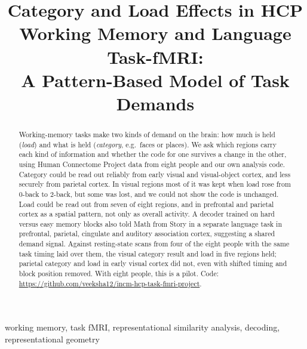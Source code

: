\documentclass[conference]{IEEEtran}
\begin{document}
\title{Category and Load Effects in HCP Working Memory and Language Task-fMRI: \\ A Pattern-Based Model of Task Demands}

\author{
\and
{}
}

\maketitle

\begin{abstract}
Working-memory tasks make two kinds of demand on the brain: how much is held (\emph{load}) and what is held (\emph{category}, e.g.\ faces or places). We ask which regions carry each kind of information and whether the code for one survives a change in the other, using Human Connectome Project data from eight people and our own analysis code. Category could be read out reliably from early visual and visual-object cortex, and less securely from parietal cortex. In visual regions most of it was kept when load rose from 0-back to 2-back, but some was lost, and we could not show the code is unchanged. Load could be read out from seven of eight regions, and in prefrontal and parietal cortex as a spatial pattern, not only as overall activity. A decoder trained on hard versus easy memory blocks also told Math from Story in a separate language task in prefrontal, parietal, cingulate and auditory association cortex, suggesting a shared demand signal. Against resting-state scans from four of the eight people with the same task timing laid over them, the visual category result and load in five regions held; parietal category and load in early visual cortex did not, even with shifted timing and block position removed. With eight people, this is a pilot. Code: \url{https://github.com/veeksha12/incm-hcp-task-fmri-project}.
\end{abstract}

\begin{IEEEkeywords}
working memory, task fMRI, representational similarity analysis, decoding, representational geometry
\end{IEEEkeywords}
\end{document}
